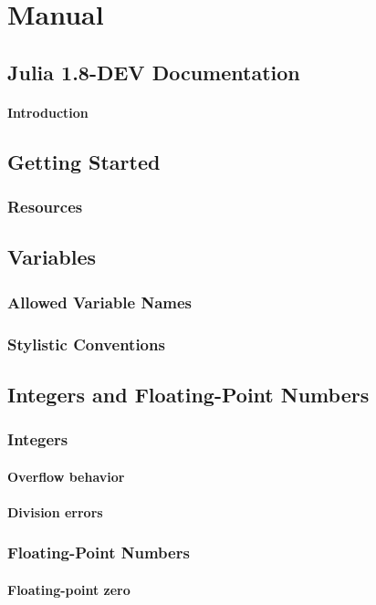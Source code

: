 
\part{Manual}
\chapter{Julia 1.8-DEV Documentation}
    \subsection{Introduction}
\chapter{Getting Started}
    \section{Resources}
\chapter{Variables}
    \section{Allowed Variable Names}
    \section{Stylistic Conventions}
\chapter{Integers and Floating-Point Numbers}
    \section{Integers}
    \subsection{Overflow behavior}
    \subsection{Division errors}
    \section{Floating-Point Numbers}
    \subsection{Floating-point zero}
